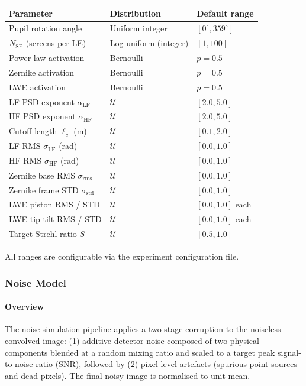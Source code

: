 \documentclass{aa}
\begin{document}
\begin{table}[h]
\centering
\begin{tabular}{|l|l|l|}
\hline
\textbf{Parameter} & \textbf{Distribution} & \textbf{Default range} \\
\hline
Pupil rotation angle & Uniform integer & $[0^\circ, 359^\circ]$ \\
$N_\mathrm{SE}$ (screens per LE) & Log-uniform (integer) & $[1, 100]$ \\
Power-law activation & Bernoulli & $p = 0.5$ \\
Zernike activation & Bernoulli & $p = 0.5$ \\
LWE activation & Bernoulli & $p = 0.5$ \\
LF PSD exponent $\alpha_\mathrm{LF}$ & $\mathcal{U}$ & $[2.0, 5.0]$ \\
HF PSD exponent $\alpha_\mathrm{HF}$ & $\mathcal{U}$ & $[2.0, 5.0]$ \\
Cutoff length $\ell_c$ (m) & $\mathcal{U}$ & $[0.1, 2.0]$ \\
LF RMS $\sigma_\mathrm{LF}$ (rad) & $\mathcal{U}$ & $[0.0, 1.0]$ \\
HF RMS $\sigma_\mathrm{HF}$ (rad) & $\mathcal{U}$ & $[0.0, 1.0]$ \\
Zernike base RMS $\sigma_\mathrm{rms}$ & $\mathcal{U}$ & $[0.0, 1.0]$ \\
Zernike frame STD $\sigma_\mathrm{std}$ & $\mathcal{U}$ & $[0.0, 1.0]$ \\
LWE piston RMS / STD & $\mathcal{U}$ & $[0.0, 1.0]$ each \\
LWE tip-tilt RMS / STD & $\mathcal{U}$ & $[0.0, 1.0]$ each \\
Target Strehl ratio $S$ & $\mathcal{U}$ & $[0.5, 1.0]$ \\
\hline
\end{tabular}
\end{table}

All ranges are configurable via the experiment configuration file.

\subsubsection{Noise Model}

\paragraph{Overview}

The noise simulation pipeline applies a two-stage corruption to the noiseless convolved image: (1) additive detector noise composed of two physical components blended at a random mixing ratio and scaled to a target peak signal-to-noise ratio (SNR), followed by (2) pixel-level artefacts (spurious point sources and dead pixels). The final noisy image is normalised to unit mean.
\end{document}
